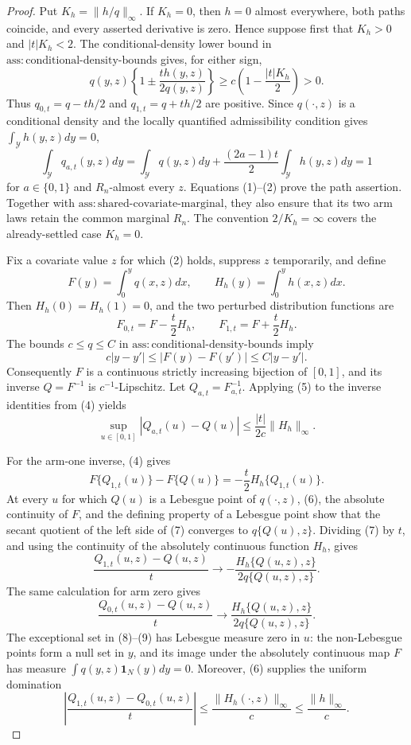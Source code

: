 \documentclass{article}
\begin{document}
\begin{proof}
Put \(K_h=\|h/q\|_{\infty}\).  If \(K_h=0\), then \(h=0\) almost everywhere, both paths coincide, and every asserted derivative is zero.  Hence suppose first that \(K_h>0\) and \(|t|K_h<2\).  The conditional-density lower bound in \(\mathrm{ass{:}conditional\text{-}density\text{-}bounds}\) gives, for either sign,
\[
q(y,z)\left\{1\pm\frac{t h(y,z)}{2q(y,z)}\right\}
\ge c\left(1-\frac{|t|K_h}{2}\right)>0.
\tag{1}
\]
Thus \(q_{0,t}=q-th/2\) and \(q_{1,t}=q+th/2\) are positive.  Since \(q(\cdot,z)\) is a conditional density and the locally quantified admissibility condition gives \(\int_{\mathcal Y}h(y,z)dy=0\),
\[
\int_{\mathcal Y}q_{a,t}(y,z)dy
=\int_{\mathcal Y}q(y,z)dy+\frac{(2a-1)t}{2}
  \int_{\mathcal Y}h(y,z)dy
=1
\tag{2}
\]
for \(a\in\{0,1\}\) and \(R_n\)-almost every \(z\).  Equations (1)--(2) prove the path assertion.  Together with \(\mathrm{ass{:}shared\text{-}covariate\text{-}marginal}\), they also ensure that its two arm laws retain the common marginal \(R_n\).  The convention \(2/K_h=\infty\) covers the already-settled case \(K_h=0\).

Fix a covariate value \(z\) for which (2) holds, suppress \(z\) temporarily, and define
\[
F(y)=\int_0^yq(x,z)dx,
\qquad
H_h(y)=\int_0^yh(x,z)dx.
\tag{3}
\]
Then \(H_h(0)=H_h(1)=0\), and the two perturbed distribution functions are
\[
F_{0,t}=F-\frac{t}{2}H_h,
\qquad
F_{1,t}=F+\frac{t}{2}H_h.
\tag{4}
\]
The bounds \(c\le q\le C\) in \(\mathrm{ass{:}conditional\text{-}density\text{-}bounds}\) imply
\[
c|y-y'|\le |F(y)-F(y')|\le C|y-y'|.
\tag{5}
\]
Consequently \(F\) is a continuous strictly increasing bijection of \([0,1]\), and its inverse \(Q=F^{-1}\) is \(c^{-1}\)-Lipschitz.  Let \(Q_{a,t}=F_{a,t}^{-1}\).  Applying (5) to the inverse identities from (4) yields
\[
\sup_{u\in[0,1]}|Q_{a,t}(u)-Q(u)|
\le \frac{|t|}{2c}\|H_h\|_{\infty}.
\tag{6}
\]

For the arm-one inverse, (4) gives
\[
F\{Q_{1,t}(u)\}-F\{Q(u)\}
=-\frac{t}{2}H_h\{Q_{1,t}(u)\}.
\tag{7}
\]
At every \(u\) for which \(Q(u)\) is a Lebesgue point of \(q(\cdot,z)\), (6), the absolute continuity of \(F\), and the defining property of a Lebesgue point show that the secant quotient of the left side of (7) converges to \(q\{Q(u),z\}\).  Dividing (7) by \(t\), and using the continuity of the absolutely continuous function \(H_h\), gives
\[
\frac{Q_{1,t}(u,z)-Q(u,z)}{t}
\longrightarrow
-\frac{H_h\{Q(u,z),z\}}{2q\{Q(u,z),z\}}.
\tag{8}
\]
The same calculation for arm zero gives
\[
\frac{Q_{0,t}(u,z)-Q(u,z)}{t}
\longrightarrow
\frac{H_h\{Q(u,z),z\}}{2q\{Q(u,z),z\}}.
\tag{9}
\]
The exceptional set in (8)--(9) has Lebesgue measure zero in \(u\): the non-Lebesgue points form a null set in \(y\), and its image under the absolutely continuous map \(F\) has measure \(\int q(y,z)\mathbf 1_N(y)dy=0\).  Moreover, (6) supplies the uniform domination
\[
\left|\frac{Q_{1,t}(u,z)-Q_{0,t}(u,z)}{t}\right|
\le \frac{\|H_h(\cdot,z)\|_{\infty}}{c}
\le \frac{\|h\|_{\infty}}{c}.
\tag{10}
\]


\end{proof}
\end{document}
